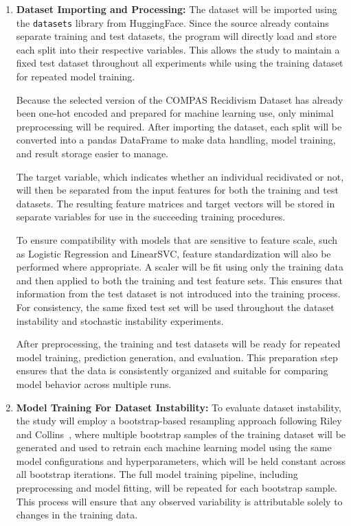 \documentclass[12pt]{article}
\begin{document}
\begin{enumerate}
  \item \textbf{Dataset Importing and Processing:}
  The dataset will be imported using the \texttt{datasets} library from HuggingFace. Since the source already contains separate training and test datasets, the program will directly load and store each split into their respective variables. This allows the study to maintain a fixed test dataset throughout all experiments while using the training dataset for repeated model training.

  Because the selected version of the COMPAS Recidivism Dataset has already been one-hot encoded and prepared for machine learning use, only minimal preprocessing will be required. After importing the dataset, each split will be converted into a pandas DataFrame to make data handling, model training, and result storage easier to manage.

  The target variable, which indicates whether an individual recidivated or not, will then be separated from the input features for both the training and test datasets. The resulting feature matrices and target vectors will be stored in separate variables for use in the succeeding training procedures.

  To ensure compatibility with models that are sensitive to feature scale, such as Logistic Regression and LinearSVC, feature standardization will also be performed where appropriate. A scaler will be fit using only the training data and then applied to both the training and test feature sets. This ensures that information from the test dataset is not introduced into the training process. For consistency, the same fixed test set will be used throughout the dataset instability and stochastic instability experiments.

  After preprocessing, the training and test datasets will be ready for repeated model training, prediction generation, and evaluation. This preparation step ensures that the data is consistently organized and suitable for comparing model behavior across multiple runs.

  \item \textbf{Model Training For Dataset Instability:}
  To evaluate dataset instability, the study will employ a bootstrap-based resampling approach following Riley and Collins~\cite{riley2023stability}, where multiple bootstrap samples of the training dataset will be generated and used to retrain each machine learning model using the same model configurations and hyperparameters, which will be held constant across all bootstrap iterations. The full model training pipeline, including preprocessing and model fitting, will be repeated for each bootstrap sample. This process will ensure that any observed variability is attributable solely to changes in the training data.


\end{enumerate}
\end{document}
